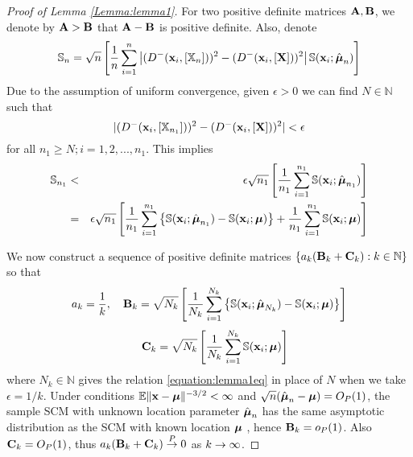 \begin{proof}[Proof of Lemma \ref{Lemma:lemma1}]
For two positive definite matrices ${\mathbf{A}}, {\mathbf{B}}$, we denote by ${\mathbf{A}} > {\mathbf{B}}$ that ${\mathbf{A}} - {\mathbf{B}}$ is positive definite. Also, denote
%
$$ {\mathbb{S}}_n = \sqrt n \left[ \frac{1}{n} \sum_{i=1}^n \left| ( D^- ({\bf{x}}_i, [ {\mathbb{X}}_n]))^2  - ( D^- ({\bf{x}}_i, [{\mathbf{X}}]))^2 \right| {\mathbb{S}} ({\bf{x}}_i; \hat{{\boldsymbol{\mu}}}_n) \right] $$
%
Due to the assumption of uniform convergence, given $\epsilon>0$ we can find $N \in \mathbb{N}$ such that
%
\begin{equation}
\label{equation:lemma1eq}
| (  D^- ({\bf{x}}_i, [ {\mathbb{X}}_{n_1}]) )^2 - ( D^- ({\bf{x}}_i, [{\mathbf{X}}]) )^2 | < \epsilon
\end{equation}
%
for all $n_1 \geq N; i = 1,2,...,n_1$. This implies
%
\begin{eqnarray}
\label{eqn:lemma1eq2}
{\mathbb{S}}_{n_1} &< & \epsilon \sqrt{n_1} \left[ \frac{1}{n_1} \sum_{i=1}^{n_1} {\mathbb{S}}( {\bf{x}}_i; \hat{{\boldsymbol{\mu}}}_{n_1}) \right]\notag\\
&=& \epsilon \sqrt{n_1} \left[ \frac{1}{n_1} \sum_{i=1}^{n_1} \left\{ {\mathbb{S}}( {\bf{x}}_i; \hat{{\boldsymbol{\mu}}}_{n_1}) -  {\mathbb{S}} ({\bf{x}}_i; {\boldsymbol{\mu}}) \right\} + \frac{1}{n_1} \sum_{i=1}^{n_1} {\mathbb{S}}( {\bf{x}}_i; {\boldsymbol{\mu}}) \right]
\end{eqnarray}

We now construct a sequence of positive definite matrices $\{a_k ({\mathbf{B}}_k + {\mathbf{C}}_k) : k \in \mathbb N\} $ so that
%
$$ a_k = \frac{1}{k}, \quad {\mathbf{B}}_k = \sqrt{N_k} \left[ \frac{1}{N_k} \sum_{i=1}^{N_k} \left\{ {\mathbb{S}}( {\bf{x}}_i; \hat{{\boldsymbol{\mu}}}_{N_k}) - {\mathbb{S}}( {\bf{x}}_i; {\boldsymbol{\mu}}) \right\} \right]$$
$$\quad {\mathbf{C}}_k = \sqrt{N_k} \left[ \frac{1}{N_k} \sum_{i=1}^{N_k} {\mathbb{S}}( {\bf{x}}_i; {\boldsymbol{\mu}}) \right] $$
%
where $N_k \in \mathbb N$ gives the relation \ref{equation:lemma1eq} in place of $N$ when we take $\epsilon = 1/k$. Under conditions $ {\mathbb{E}} \|{\bf{x}} - {\boldsymbol{\mu}}\|^{-3/2} < \infty $ and $\sqrt n (\hat{{\boldsymbol{\mu}}}_n - {\boldsymbol{\mu}}) = O_P(1)$, the sample SCM with unknown location parameter $\hat{{\boldsymbol{\mu}}}_n$ has the same asymptotic distribution as the SCM with known location ${\boldsymbol{\mu}}$ \citep{durre14}, hence ${\mathbf{B}}_k = o_P(1)$. Also ${\mathbf{C}}_k = O_P(1)$, thus $a_k ({\mathbf{B}}_k + {\mathbf{C}}_k) \stackrel{P}{\rightarrow} 0$ as $k \rightarrow \infty$.


\end{proof}
